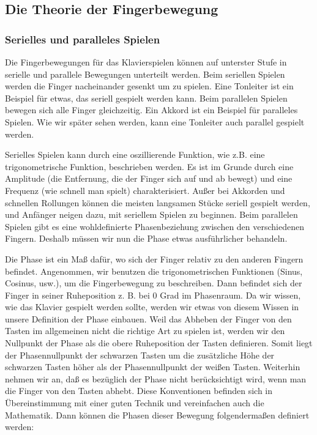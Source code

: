 
\subsection{Die Theorie der Fingerbewegung}
\label{c1iv2}

\subsubsection{Serielles und paralleles Spielen}
\label{c1iv2a}

Die Fingerbewegungen für das Klavierspielen können auf unterster Stufe in serielle und parallele Bewegungen unterteilt werden.
Beim seriellen Spielen werden die Finger nacheinander gesenkt um zu spielen.
Eine Tonleiter ist ein Beispiel für etwas, das seriell gespielt werden kann.
Beim parallelen Spielen bewegen sich alle Finger gleichzeitig.
Ein Akkord ist ein Beispiel für paralleles Spielen.
Wie wir später sehen werden, kann eine Tonleiter auch parallel gespielt werden.

Serielles Spielen kann durch eine oszillierende Funktion, wie z.B. eine trigonometrische Funktion, beschrieben werden.
Es ist im Grunde durch eine Amplitude (die Entfernung, die der Finger sich auf und ab bewegt) und eine Frequenz (wie schnell man spielt) charakterisiert.
Außer bei Akkorden und schnellen Rollungen können die meisten langsamen Stücke seriell gespielt werden, und Anfänger neigen dazu, mit seriellem Spielen zu beginnen.
Beim parallelen Spielen gibt es eine wohldefinierte Phasenbeziehung zwischen den verschiedenen Fingern.
Deshalb müssen wir nun die Phase etwas ausführlicher behandeln.

Die Phase ist ein Maß dafür, wo sich der Finger relativ zu den anderen Fingern befindet.
Angenommen, wir benutzen die trigonometrischen Funktionen (Sinus, Cosinus, usw.), um die Fingerbewegung zu beschreiben.
Dann befindet sich der Finger in seiner Ruheposition z. B. bei 0 Grad im Phasenraum.
Da wir wissen, wie das Klavier gespielt werden sollte, werden wir etwas von diesem Wissen in unsere Definition der Phase einbauen.
Weil das Abheben der Finger von den Tasten im allgemeinen nicht die richtige Art zu spielen ist, werden wir den Nullpunkt der Phase als die obere Ruheposition der Tasten definieren.
Somit liegt der Phasennullpunkt der schwarzen Tasten um die zusätzliche Höhe der schwarzen Tasten höher als der Phasennullpunkt der weißen Tasten.
Weiterhin nehmen wir an, daß es bezüglich der Phase nicht berücksichtigt wird, wenn man die Finger von den Tasten abhebt.
Diese Konventionen befinden sich in Übereinstimmung mit einer guten Technik und vereinfachen auch die Mathematik.
Dann können die Phasen dieser Bewegung folgendermaßen definiert werden:

